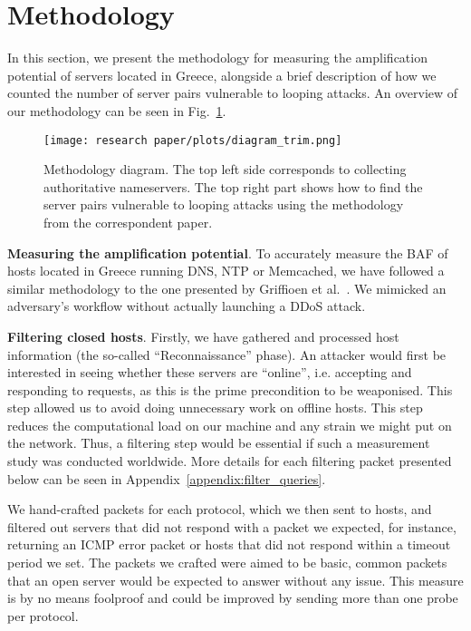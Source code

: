 \section{Methodology}

 In this section, we present the methodology for measuring the amplification potential of servers located in Greece, alongside a brief description of how we counted the number of server pairs vulnerable to looping attacks. An overview of our methodology can be seen in Fig.~\ref{fig:diagram}.

\captionsetup{font=small}
\begin{figure}[t]
  \centering
  \texttt{[image: research paper/plots/diagram\_trim.png]}
  \caption{Methodology diagram. The top left side corresponds to collecting authoritative nameservers. The top right part shows how to find the server pairs vulnerable to looping attacks using the methodology from the correspondent paper.}
  \label{fig:diagram}
\end{figure}


 \textbf{Measuring the amplification potential}. To accurately measure the BAF of hosts located in Greece running DNS, NTP or Memcached, we have followed a similar methodology to the one presented by Griffioen et al.~\cite{griffioen_scan_2021}. We mimicked an adversary's workflow without actually launching a DDoS attack.


 \textbf{Filtering closed hosts}. Firstly, we have gathered and processed host information (the so-called ``Reconnaissance'' phase). An attacker would first be interested in seeing whether these servers are ``online'', i.e. accepting and responding to requests, as this is the prime precondition to be weaponised. This step allowed us to avoid doing unnecessary work on offline hosts. This step reduces the computational load on our machine and any strain we might put on the network. Thus, a filtering step would be essential if such a measurement study was conducted worldwide. More details for each filtering packet presented below can be seen in Appendix~\ref{appendix:filter_queries}.

 We hand-crafted packets for each protocol, which we then sent to hosts, and filtered out servers that did not respond with a packet we expected, for instance, returning an ICMP error packet or hosts that did not respond within a timeout period we set. The packets we crafted were aimed to be basic, common packets that an open server would be expected to answer without any issue. This measure is by no means foolproof and could be improved by sending more than one probe per protocol.
    
